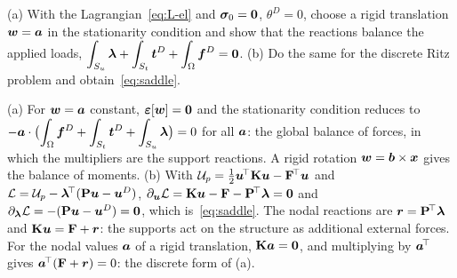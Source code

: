 
\label{exo:lagrange-el}
(a) With the Lagrangian~\eqref{eq:L-el} and $\bm{\sigma}_0=\bm{0}$, $\theta^D=0$,
choose a rigid translation $\bm{w}=\bm{a}$ in the stationarity condition and
show that the reactions balance the applied loads,
$\displaystyle \int_{S_u}\bm{\lambda}+\int_{S_t}\bm{t}^{D}+\int_\Omega\bm{f}^{D}=\bm{0}$. (b) Do the same for
the discrete Ritz problem and obtain~\eqref{eq:saddle}.
\begin{solution}
(a) For $\bm{w}=\bm{a}$ constant, $\bm{\varepsilon}[\bm{w}]=\bm{0}$ and the stationarity
condition reduces to
$\displaystyle -\bm{a}\cdot\bigl(\int_\Omega\bm{f}^{D}+\int_{S_t}\bm{t}^{D}+\int_{S_u}\bm{\lambda}\bigr)=0$
for all $\bm{a}$: the global balance of forces, in which the multipliers are
the support reactions. A rigid rotation $\bm{w}=\bm{b}\times\bm{x}$ gives the
balance of moments.
(b) With $\mathcal U_p=\tfrac12\bm{u}^{\!\top}\mathbf{K}\bm{u}-\mathbf{F}^{\!\top}\bm{u}$ and
$\mathcal L=\mathcal U_p-\bm{\lambda}^{\!\top}(\mathbf{P}\bm{u}-\bm{u}^{D})$,
$\partial_{\bm{u}}\mathcal L=\mathbf{K}\bm{u}-\mathbf{F}-\mathbf{P}^{\!\top}\bm{\lambda}=\bm{0}$ and
$\partial_{\bm{\lambda}}\mathcal L=-(\mathbf{P}\bm{u}-\bm{u}^{D})=\bm{0}$, which
is~\eqref{eq:saddle}. The nodal reactions are $\bm{r}=\mathbf{P}^{\!\top}\bm{\lambda}$ and
$\mathbf{K}\bm{u}=\mathbf{F}+\bm{r}$: the supports act on the structure as additional
external forces. For the nodal values $\bm{a}$ of a rigid translation,
$\mathbf{K}\bm{a}=\bm{0}$, and multiplying by $\bm{a}^{\!\top}$ gives
$\bm{a}^{\!\top}(\mathbf{F}+\bm{r})=0$: the discrete form of (a).
\end{solution}

